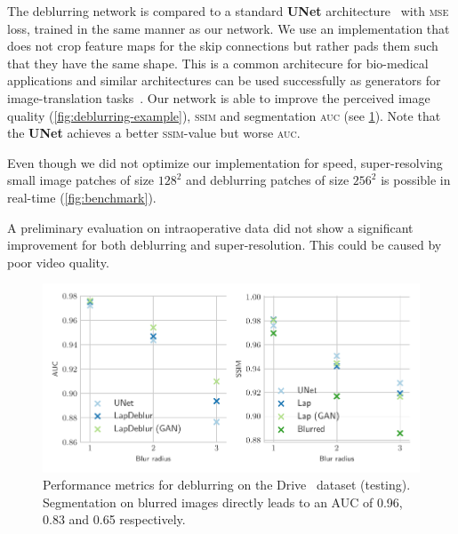 \documentclass{scrartcl}
\begin{document}
The deblurring network is compared to a standard \textbf{UNet} architecture~\cite{Unet} with \textsc{mse} loss, trained in the same manner as our network.
We use an implementation that does not crop feature maps for the skip connections but rather pads them such that they have the same shape.
This is a common architecure for bio-medical applications and similar architectures can be used successfully as generators for image-translation tasks~\cite{PatchGAN}.
Our network is able to improve the perceived image quality (\cref{fig:deblurring-example}), \textsc{ssim} and segmentation \textsc{auc} (see \cref{fig:deblurring-metrics}).
Note that the \textbf{UNet} achieves a better \textsc{ssim}-value but worse \textsc{auc}.

Even though we did not optimize our implementation for speed, super-resolving small image patches of size $128^2$ and deblurring patches of size $256^2$ is possible in real-time (\cref{fig:benchmark}).

A preliminary evaluation on intraoperative data did not show a significant improvement for both deblurring and super-resolution.
This could be caused by poor video quality.

\begin{figure}[htb]
\centering
\includegraphics[]{deblur_complete_paper}
\caption{Performance metrics for deblurring on the Drive~\cite{Drive} dataset (testing).\\
Segmentation on blurred images directly leads to an AUC of 0.96, 0.83 and 0.65 respectively.}
\label{fig:deblurring-metrics}
\end{figure}
\end{document}
